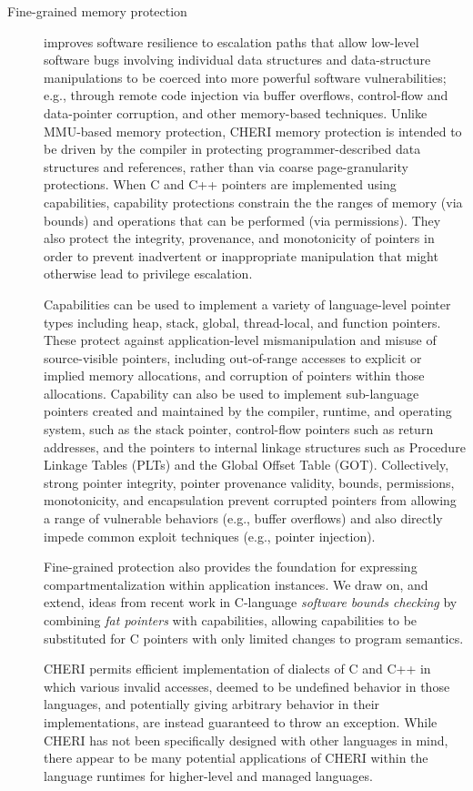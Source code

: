 \begin{description}
\item[Fine-grained memory protection]
improves software resilience to escalation paths
that allow low-level software bugs involving individual data
structures and data-structure manipulations to be coerced into more powerful
software vulnerabilities;
e.g., through remote code injection via buffer overflows, control-flow and
data-pointer corruption, and other memory-based techniques.
Unlike MMU-based memory protection, CHERI memory protection is intended to
be driven by the compiler in protecting programmer-described data structures
and references, rather than via coarse page-granularity protections.
When C and C++ pointers are implemented using capabilities, capability
protections constrain the the ranges of memory (via bounds) and operations
that can be performed (via permissions).
They also protect the integrity, provenance, and monotonicity of pointers in
order to prevent inadvertent or inappropriate manipulation
that might otherwise lead to privilege escalation.

Capabilities can be used to implement a variety of language-level pointer
types including heap, stack, global, thread-local, and function pointers.
These protect against application-level mismanipulation and misuse of
source-visible pointers, including out-of-range accesses to explicit or
implied memory allocations, and corruption of pointers within those
allocations.
Capability can also be used to implement sub-language pointers created and
maintained by the compiler, runtime, and operating system, such as the stack
pointer, control-flow pointers such as return addresses, and the pointers to
internal linkage structures such as Procedure Linkage Tables (PLTs) and the
Global Offset Table (GOT).
Collectively, strong pointer integrity, pointer provenance validity, bounds,
permissions, monotonicity, and encapsulation prevent corrupted pointers from
allowing a range of vulnerable behaviors (e.g., buffer overflows) and also
directly impede common exploit techniques (e.g., pointer injection).

Fine-grained protection also provides the foundation for expressing
compartmentalization within application instances.
We draw on, and extend, ideas from recent work in C-language {\em software
bounds checking} by combining {\em fat pointers} with capabilities, allowing
capabilities to be substituted for C pointers with only limited changes to
program semantics.

CHERI permits efficient implementation of dialects of C and C++ in
which various invalid accesses, deemed to be undefined behavior in
those languages, and potentially giving arbitrary behavior in
their implementations, are instead guaranteed to throw an exception.
While CHERI has not been specifically designed with other languages in mind,
there appear to be many potential applications of CHERI within the language
runtimes for higher-level and managed languages.


\end{description}
